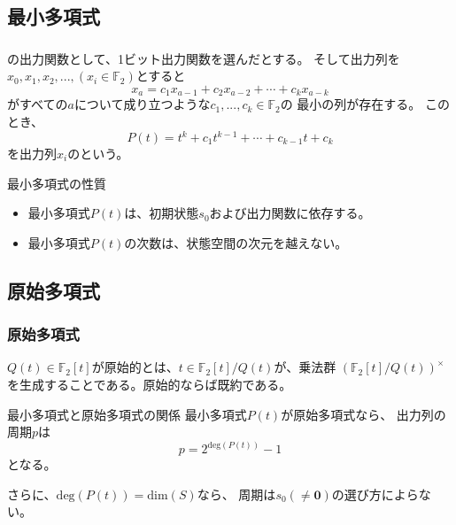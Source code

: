 \documentclass[cjk, dvips, xcolor=dvipsnames, hyperref={bookmarks=false}]{beamer}
\def\F2{{\mathbb F}_2}
\begin{document}
\subsection{最小多項式}
\begin{frame}[t]
  \frametitle{\insertsubsection}
  \FLPRNG の出力関数として、1ビット出力関数を選んだとする。
  そして出力列を$x_0, x_1, x_2, ..., (x_i \in \F2)$とすると
  \[
  x_a = c_1x_{a-1} + c_{2}x_{a-2} + \cdots + c_{k}x_{a-k}
  \]
  がすべての$a$について成り立つような$c_1,...,c_k \in \F2$の
  最小の列が存在する。
  このとき、
  \[
  P(t) = t^k + c_1t^{k-1} + \cdots + c_{k-1}t + c_{k}
  \]
  を出力列$x_i$のという。

  \pause
  \begin{block}{最小多項式の性質}
    \begin{itemize}
    \item 最小多項式$P(t)$は、初期状態$s_0$および出力関数に依存する。
    \item 最小多項式$P(t)$の次数は、状態空間の次元を越えない。
    \end{itemize}
  \end{block}

\end{frame}

\subsection{原始多項式}
\begin{frame}[t]
  \frametitle{原始多項式}

  $Q(t) \in \F2[t]$が原始的とは、$t \in \F2[t]/Q(t)$が、乗法群
  $(\F2[t]/Q(t))^{\times}$を生成することである。原始的ならば既約である。

  \pause
  \begin{block}{最小多項式と原始多項式の関係}
    最小多項式$P(t)$が原始多項式なら、
    出力列の周期$p$は
    \[
    p = 2^{\mathrm{deg}(P(t))}-1
    \]
    となる。

    さらに、$\mathrm{deg}(P(t)) = \mathrm{dim}(S)$なら、
    周期は$s_0 (\neq \mathbf{0})$の選び方によらない。
  \end{block}
\end{frame}
\end{document}
